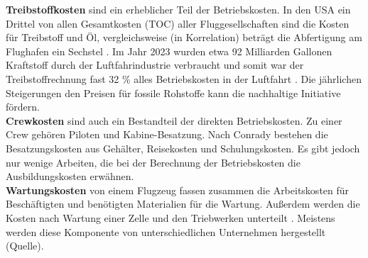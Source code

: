%
\textbf{Treibstoffkosten} sind ein erheblicher Teil der Betriebskosten. In den USA ein Drittel von allen Gesamtkosten (TOC) aller 
Fluggesellschaften sind die Kosten für Treibstoff und Öl, vergleichsweise (in Korrelation) beträgt die Abfertigung am Flughafen ein Sechstel 
\cite{conrady2019luftverkehr}. 
Im Jahr 2023 wurden etwa 92 Milliarden Gallonen Kraftstoff durch der Luftfahrindustrie verbraucht und somit
war der Treibstoffrechnung fast 32 \% alles Betriebskosten in der Luftfahrt \cite{iata_industry_statistics_2024}.
Die jährlichen Steigerungen den Preisen für fossile Rohstoffe kann die nachhaltige Initiative fördern. \\
%
%
%
\textbf{Crewkosten} sind auch ein Bestandteil der direkten Betriebskosten. Zu einer Crew gehören Piloten und Kabine-Besatzung.
Nach Conrady \cite{conrady2019luftverkehr} bestehen die Besatzungskosten aus Gehälter, Reisekosten und Schulungskosten.
Es gibt jedoch nur wenige Arbeiten, die bei der Berechnung der Betriebskosten die Ausbildungskosten erwähnen. \\
%
\textbf{Wartungskosten} von einem Flugzeug fassen zusammen die Arbeitskosten für Beschäftigten und benötigten Materialien für die Wartung.
Außerdem werden die Kosten nach Wartung einer Zelle und den Triebwerken unterteilt \cite{wang2021research}. 
Meistens werden diese Komponente von unterschiedlichen Unternehmen hergestellt (Quelle).
